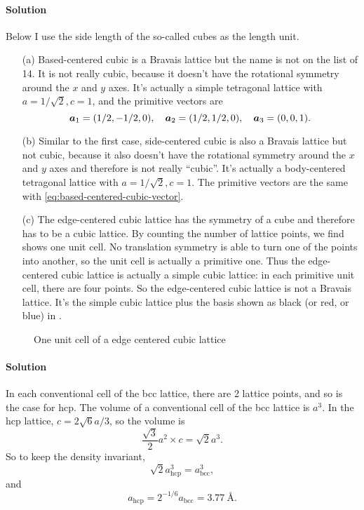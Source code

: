 \documentclass[hyperref, a4paper]{article}
\begin{document}
\paragraph{Solution} 
Below I use the side length of the so-called cubes as the length unit.
\begin{itemize}
\item[(a)] Based-centered cubic is a Bravais lattice but the name is not on the list of 14. 
It is not really cubic, 
because it doesn't have the rotational symmetry around the $x$ and $y$ axes.
It's actually a simple tetragonal lattice with $a= 1 / \sqrt{2}, c = 1$, and
the primitive vectors are 
\begin{equation}
    \vb*{a}_1 = (1/2, -1/2, 0), \quad \vb*{a}_2 = (1/2, 1/2, 0), \quad \vb*{a}_3 = (0, 0, 1).
    \label{eq:based-centered-cubic-vector}
\end{equation}
\item[(b)] Similar to the first case, 
side-centered cubic is also a Bravais lattice but not cubic,
because it also doesn't have the rotational symmetry around the $x$ and $y$ axes
and therefore is not really ``cubic''.
It's actually a body-centered tetragonal lattice with $a= 1 / \sqrt{2}, c = 1$.
The primitive vectors are the same with \eqref{eq:based-centered-cubic-vector}.
\item[(c)] The edge-centered cubic lattice has the symmetry of a cube and therefore has to be a cubic lattice.
By counting the number of lattice points, 
we find  shows one unit cell.
No translation symmetry is able to turn one of the points into another,
so the unit cell is actually a primitive one.
Thus the edge-centered cubic lattice is actually a simple cubic lattice: 
in each primitive unit cell,
there are four points.
So the edge-centered cubic lattice is not a Bravais lattice.
It's the simple cubic lattice plus the basis shown as black (or red, or blue) in 
.
\end{itemize}

\begin{figure}
    \centering
    
    \caption{One unit cell of a edge centered cubic lattice}
    \label{fig:unit-cell-edge-centered}
\end{figure}

\paragraph{Solution} In each conventional cell of the bcc lattice, 
there are 2 lattice points, and so is the case for hcp.
The volume of a conventional cell of the bcc lattice is $a^3$.
In the hcp lattice, $c = 2 \sqrt{6} a / 3$,
so the volume is 
\[
    \frac{\sqrt{3}}{2} a^2 \times c = \sqrt{2} a^3.
\]
So to keep the density invariant,
\[
    \sqrt{2} a_\text{hcp}^3 = a_{\text{bcc}}^3,
\]
and 
\begin{equation}
    a_{\text{hcp}} = 2^{-1/6} a_{\text{bcc}} = \SI{3.77}{\angstrom}.
\end{equation}
\end{document}
